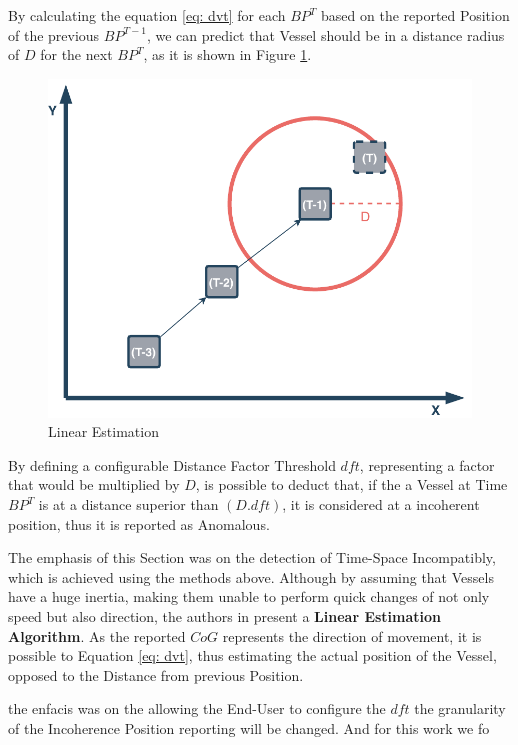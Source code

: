 By calculating the equation \ref{eq: dvt} for each $BP^{T}$ based on the reported Position of the previous $BP^{T-1}$, we can predict that Vessel should be in a distance radius of $D$ for the next $BP^T$, as it is shown in Figure \ref{fig: dvt}.

\begin{figure}[H]
	\centering
	\includegraphics[scale = .6]{figures/Ch4/DVT.pdf}
    \caption{Linear Estimation}
    \label{fig: dvt}
\end{figure}

By defining a configurable Distance Factor Threshold $dft$, representing a factor that would be multiplied by $D$, is possible to deduct that, if the a Vessel at Time $BP^{T}$ is at a distance superior than $(D.dft)$, it is considered at a incoherent position, thus it is reported as Anomalous.

The emphasis of this Section was on the detection of Time-Space Incompatibly, which is achieved using the methods above. Although by assuming that Vessels have a huge inertia, making them unable to perform quick changes of not only speed but also direction, the authors in \cite{Sadowski2015AlgorithmsCompression} present a \textbf{Linear Estimation Algorithm}.
As the reported $CoG$ represents the direction of movement, it is possible to Equation \ref{eq: dvt}, thus estimating the actual position of the Vessel, opposed to the Distance from previous Position. 

\iffalse

the enfacis was on the  allowing the End-User to configure the $dft$ the granularity of the Incoherence Position reporting will be changed. And for this work we fo

